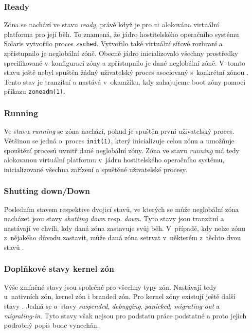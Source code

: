\subsubsection{Ready}
\label{chapter:zones:administration:states:ready}
Zóna se nachází ve stavu \textit{ready}, právě když je pro ni alokována virtuální platforma pro její běh. To znamená, že jádro
hostitelského operačního systému Solaris vytvořilo proces \verb|zsched|. Vytvořilo také virtuální síťové rozhraní a zpřístupnilo
je neglobální zóně. Obecně jádro inicializovalo všechny prostředky specifikované v~konfiguraci zóny a zpřístupnilo je dané
neglobální zóně. V~tomto stavu ještě nebyl spuštěn žádný uživatelský proces asociovaný s~konkrétní zónou \cite{oracle:solaris:zones:states}.
Tento stav je tranzitní a nastává v~okamžiku, kdy zahajujeme boot zóny pomocí příkazu \verb|zoneadm(1)|.
\subsubsection{Running}
\label{chapter:zones:administration:states:running}
Ve stavu \textit{running} se zóna nachází, pokud je spuštěn první uživatelský proces. Většinou se jedná o~proces \verb|init(1)|,
který inicializuje celou zónu a umožňuje spouštění procesů uvnitř dané neglobální zóny. Zóna ve stavu \textit{running} má tedy
alokovanou virtuální platformu v~jádru hostitelského operačního systému, inicializované všechna zařízení a spuštěné uživatelské
procesy.
\subsubsection{Shutting down/Down}
\label{chapter:zones:administration:states:down}
Posledním stavem respektive dvojicí stavů, ve kterých se může neglobální zóna nacházet jsou stavy \textit{shutting down} resp. 
\textit{down}. Tyto stavy jsou tranzitní a nastávají ve chvíli, kdy daná zóna zastavuje svůj běh. V~případě, kdy nelze zónu
z~nějakého důvodu zastavit, může daná zóna setrvat v~některém z~těchto dvou stavů \cite{oracle:solaris:zones:states}. 
\subsubsection{Doplňkové stavy kernel zón}
\label{chapter:zones:administration:states:kernel_zones}
Výše zmíněné stavy jsou společné pro všechny typy zón. Nastávají tedy u~nativních zón, kernel zón i branded zón. Pro kernel
zóny existují ještě další stavy . Jedná se o~stavy \textit{suspended}, \textit{debugging}, \textit{panicked}, \textit{migrating-out}
a \textit{migrating-in}. Tyto stavy však nejsou pro podstatu práce podstatné a proto jejich podrobný popis bude vynechán.
